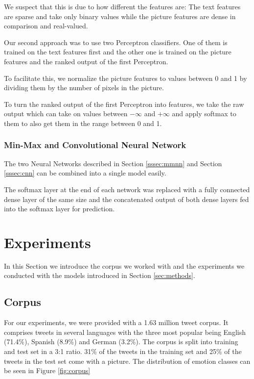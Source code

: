 \documentclass[11pt]{article}
\begin{document}
We suspect that this is due to how different the features are: The text features
are sparse and take only binary values while the picture features are dense in
comparison and real-valued.

Our second approach was to use two Perceptron classifiers.
One of them is trained on the text features first and the other one is trained
on the picture features and the ranked output of the first Perceptron.

To facilitate this, we normalize the picture features to values between 0 and 1
by dividing them by the number of pixels in the picture.

To turn the ranked output of the first Perceptron into features, we take the raw
output which can take on values between $-\infty$ and $+\infty$ and apply
softmax to them to also get them in the range between 0 and 1.

\subsubsection{Min-Max and Convolutional Neural Network}

The two Neural Networks described in Section \ref{sssec:mmnn} and Section
\ref{sssec:cnn} can be combined into a single model easily.

The softmax layer at the end of each network was replaced with a fully connected
dense layer of the same size and the concatenated output of both dense layers
fed into the softmax layer for prediction.

\section{Experiments}

In this Section we introduce the corpus we worked with and the experiments we
conducted with the models introduced in Section \ref{sec:methods}.

\subsection{Corpus}
For our experiments, we were provided with a 1.63 million tweet corpus.
It comprises tweets in several languages with the three most popular being English
(71.4\%), Spanish (8.9\%) and German (3.2\%).
The corpus is split into training and test set in a 3:1 ratio.
31\% of the tweets in the training set and 25\% of the tweets in the test set
come with a picture.
The distribution of emotion classes can be seen in Figure \ref{fig:corpus}
\end{document}
